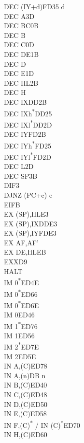 \documentclass[oneside,a4paper]{book}
\begin{document}
\begin{multicols}{3}
{\begin{tabbing}
DEC (IY+d)\>FD35 d\\
DEC A\>3D\\
DEC BC\>0B\\
DEC B\\
DEC C\>0D\\
DEC DE\>1B\\
DEC D\\
DEC E\>1D\\
DEC HL\>2B\\
DEC H\\
DEC IX\>DD2B\\
DEC IXh\textsuperscript{*}\>DD25\\
DEC IXl\textsuperscript{*}\>DD2D\\
DEC IY\>FD2B\\
DEC IYh\textsuperscript{*}\>FD25\\
DEC IYl\textsuperscript{*}\>FD2D\\
DEC L\>2D\\
DEC SP\>3B\\
DI\>F3\\
DJNZ (PC+e) e\\
EI\>FB\\
EX (SP),HL\>E3\\
EX (SP),IX\>DDE3\\
EX (SP),IY\>FDE3\\
EX AF,AF'\\
EX DE,HL\>EB\\
EXX\>D9\\
HALT\\
IM 0\textsuperscript{*}\>ED4E\\
IM 0\textsuperscript{*}\>ED66\\
IM 0\textsuperscript{*}\>ED6E\\
IM 0\>ED46\\
IM 1\textsuperscript{*}\>ED76\\
IM 1\>ED56\\
IM 2\textsuperscript{*}\>ED7E\\
IM 2\>ED5E\\
IN A,(C)\>ED78\\
IN A,(n)\>DB n\\
IN B,(C)\>ED40\\
IN C,(C)\>ED48\\
IN D,(C)\>ED50\\
IN E,(C)\>ED58\\
IN F,(C)\textsuperscript{*} / IN (C)\textsuperscript{*}\>ED70\\
IN H,(C)\>ED60\\

\end{tabbing}}
\end{multicols}
\end{document}
